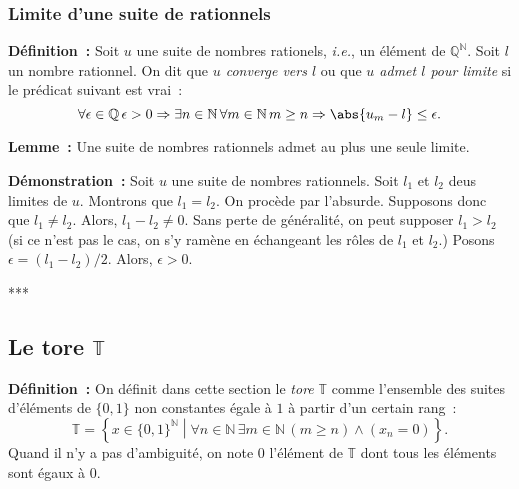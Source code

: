 \medskip

\subsubsection{Limite d'une suite de rationnels}

\noindent\textbf{Définition :} Soit $u$ une suite de nombres rationels, \emph{i.e.}, un élément de $\mathbb{Q}^{\mathbb{N}}$.
    Soit $l$ un nombre rationnel.
    On dit que \emph{$u$ converge vers $l$} ou que \emph{$u$ admet $l$ pour limite} si le prédicat suivant est vrai : 
    \begin{equation*}
        \forall \epsilon \in \mathbb{Q} \, 
        \epsilon > 0 \Rightarrow
            \exists n \in \mathbb{N} \, 
            \forall m \in \mathbb{N} \, 
            m \geq n \Rightarrow
                \abs{u_m - l} \leq \epsilon .
    \end{equation*}

\medskip

\noindent\textbf{Lemme :} Une suite de nombres rationnels admet au plus une seule limite.

\medskip

\noindent\textbf{Démonstration :} Soit $u$ une suite de nombres rationnels. 
    Soit $l_1$ et $l_2$ deus limites de $u$. 
    Montrons que $l_1 = l_2$. 
    On procède par l'absurde. 
    Supposons donc que $l_1 \neq l_2$.
    Alors, $l_1 - l_2 \neq 0$. 
    Sans perte de généralité, on peut supposer $l_1 > l_2$ (si ce n'est pas le cas, on s'y ramène en échangeant les rôles de $l_1$ et $l_2$.)
    Posons $\epsilon = (l_1 - l_2) / 2$. 
    Alors, $\epsilon > 0$.

***

\subsection{Le tore \texorpdfstring{$\mathbb{T}$}{T}}

\noindent\textbf{Définition :} On définit dans cette section le \emph{tore} $\mathbb{T}$ comme l'ensemble des suites d'éléments de $\lbrace 0, 1 \rbrace$ non constantes égale à $1$ à partir d'un certain rang : 
\begin{equation*}
    \mathbb{T} = \left\lbrace
        x \in \lbrace 0, 1 \rbrace^{\mathbb{N}} 
        \middle\vert
        \forall n \in \mathbb{N} \, \exists m \in \mathbb{N} \, (m \geq n) \wedge (x_n = 0)
    \right\rbrace .
\end{equation*}
Quand il n'y a pas d'ambiguité, on note $0$ l'élément de $\mathbb{T}$ dont tous les éléments sont égaux à $0$.

